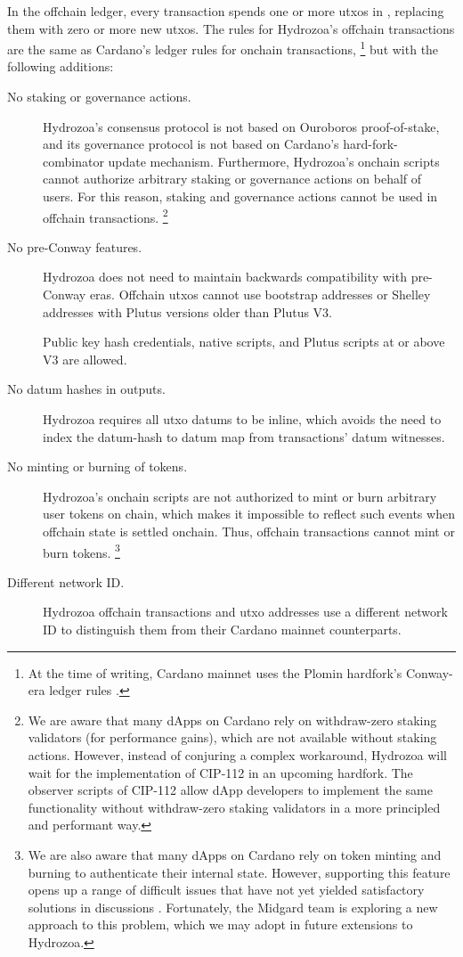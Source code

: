 \documentclass[../hydrozoa.tex]{subfiles}
\begin{document}
In the offchain ledger, every transaction spends one or more utxos in , replacing them with zero or more new utxos.
The rules for Hydrozoa's offchain transactions are the same as Cardano's ledger rules for onchain transactions,%
\footnote{At the time of writing, Cardano mainnet uses the Plomin hardfork's Conway-era ledger rules \citep{IntersectMBOCardanoLedgerV117402025}.}
but with the following additions:
\begin{description}
    \item[No staking or governance actions.]
      Hydrozoa's consensus protocol is not based on Ouroboros proof-of-stake, and its governance protocol is not based on Cardano's hard-fork-combinator update mechanism.
      Furthermore, Hydrozoa's onchain scripts cannot authorize arbitrary staking or governance actions on behalf of users.
      For this reason, staking and governance actions cannot be used in offchain transactions.%
      \footnote{We are aware that many dApps on Cardano rely on withdraw-zero staking validators (for performance gains), which are not available without staking actions.
        However, instead of conjuring a complex workaround, Hydrozoa will wait for the implementation of CIP-112 \citep{DiSarroCIP112ObserveScript2024} in an upcoming hardfork.
        The observer scripts of CIP-112 allow dApp developers to implement the same functionality without withdraw-zero staking validators in a more principled and performant way.}
    \item[No pre-Conway features.] Hydrozoa does not need to maintain backwards compatibility with pre-Conway eras.
      Offchain utxos cannot use bootstrap addresses or Shelley addresses with Plutus versions older than Plutus V3.

      Public key hash credentials, native scripts, and Plutus scripts at or above V3 are allowed.
    \item[No datum hashes in outputs.] Hydrozoa requires all utxo datums to be inline, which avoids the need to index the datum-hash to datum map from transactions' datum witnesses.
    \item[No minting or burning of tokens.]
      Hydrozoa's onchain scripts are not authorized to mint or burn arbitrary user tokens on chain, which makes it impossible to reflect such events when offchain state is settled onchain.
      Thus, offchain transactions cannot mint or burn tokens.%
      \footnote{We are also aware that many dApps on Cardano rely on token minting and burning to authenticate their internal state.
        However, supporting this feature opens up a range of difficult issues that have not yet yielded satisfactory solutions in discussions \citep{IOGExcludePhantomTokens2025}.
        Fortunately, the Midgard team is exploring a new approach to this problem, which we may adopt in future extensions to Hydrozoa.}
    \item[Different network ID.] Hydrozoa offchain transactions and utxo addresses use a different network ID to distinguish them from their Cardano mainnet counterparts.
\end{description}
\end{document}
